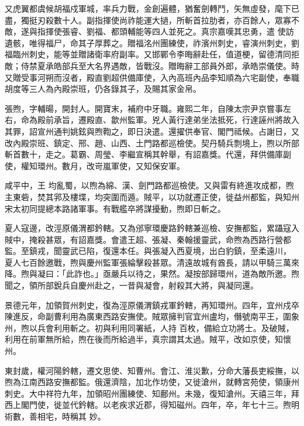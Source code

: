 \begin{pinyinscope}
 又虎翼都虞候胡福戍軍城，率兵力戰，金創遍體，猶奮劍轉鬥，矢無虛發，麾下已盡，獨挺刃殺數十人。副指揮使尚祚能運大撾，所斬首拉肋者，亦百餘人，眾寡不敵，遂與指揮使張睿、劉福、都頭輔能等四人並死之。真宗嘉嘆其忠勇，遣
 使訪遺骸，唯得福尸，命其子厚葬之。贈福洺州團練使，祚濱州刺史，睿演州刺史，劉福臨州刺史，能等並贈諸衛率府副率。又邯鄲令李晦辭赴任，值道梗，留德清同拒敵；侍禁夏承皓部兵至大名界遇敵，皆戰沒。贈晦辭工部員外郎，承皓崇儀使。時又贈受事河朔而沒者，殿直劉超供備庫使，入內高班內品李知順為六宅副使，奉職胡度等三人為內殿崇班，仍各錄其子，及賜其家金帛。



 張煦，字輔暘，開封人。開寶末，補府中牙職。雍熙二年，自陳太宗尹京嘗事左右，命為殿前承旨，遷殿直、歙州監軍。兇人黃行達弟坐法抵死，行達誣州將故入其罪，詔宣州通判姚鉉與煦鞫之，即日決遣。還擢供奉官、閣門祗候。占謝日，又改內殿崇班、鎮定、邢、趙、山西、土門路都巡檢使。契丹騎兵剽境上，煦以所部斬首數十，走之。葛霸、周瑩、李繼宣稱其幹舉，有詔嘉獎。代還，拜供備庫副使，權知環州。數月，改岢嵐軍使，又知保安軍。



 咸平中，王
 均亂蜀，以煦為綿、漢、劍門路都巡檢使。又與雷有終進攻成都，煦主東砦，焚其郛及樓堞，均突圍而遁。賊平，以功就遷正使，徙益州都監，與知州宋太初同提總本路諸軍事。有戰艦卒將謀擾動，煦即日斬之。



 夏人寇邊，改涇原儀渭都鈐轄。又為邠寧環慶路鈐轄兼巡檢、安撫都監，累躡寇入賊中，掩殺甚眾，有詔嘉獎。會遣王超、張凝、秦翰援靈武，命煦為西路行營都監。至鎮戎，聞靈武已陷，復還本任。與張凝入西夏境，出白豹鎮，至柔遠川，
 夏人七百餘邀戰，煦與慶州監軍張綸擊殺甚眾。清遠故城有酋長，請以甲騎三萬來降。煦與凝曰：「此詐也。」亟嚴兵以待之，果然。凝按部歸環州，道為敵所邀。煦聞之，領所部銳兵自慶州赴之，一昔與凝會，射殺其大將，與凝同還。



 景德元年，加領賀州刺史，復為涇原儀渭鎮戎軍鈐轄，再知環州。四年，宜州戍卒陳進反，命副曹利用為廣東西路安撫使。賊眾擁判官宜州盧均，僭號南平王，圍象州，煦以兵會利用斬之。初與利用同署紙，人持
 百枚，備給立功將士。及破賊，利用在前軍無所給，煦在後而所給過半，真宗謂其太過。賊平，改如京使，知懷州。



 東封歲，權河陽鈐轄，遷文思使、知曹州。會江、淮災歉，分命大藩長吏綏撫，以煦為江南西路安撫都監。俄還濟陰，加北作坊使，又徙滄州，就轉宮苑使，領康州刺史。大中祥符九年，加領昭州團練使、知鄜州。未幾，復知滄州。天禧三年，拜西上閣門使，徙並代鈐轄。以老疾求近郡，得知磁州。四年，卒，年七十三。煦明術數，善相宅，時稱其
 妙。




\end{pinyinscope}
